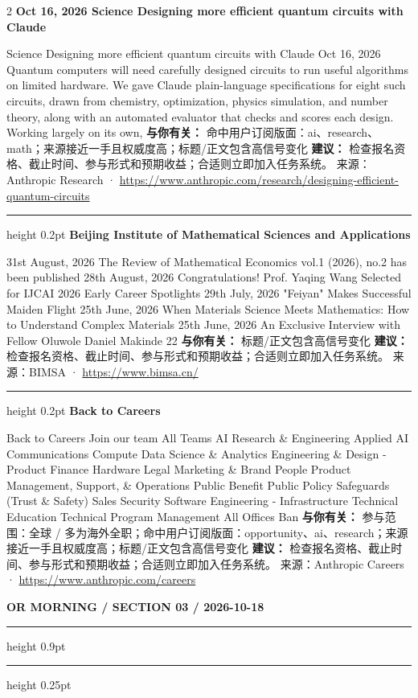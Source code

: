 \documentclass[10.5pt]{ctexart}
\begin{document}
\begin{multicols}{2}
{\large\bfseries Oct 16, 2026 Science Designing more efficient quantum circuits with Claude}\par
Science Designing more efficient quantum circuits with Claude Oct 16, 2026 Quantum computers will need carefully designed circuits to run useful algorithms on limited hardware. We gave Claude plain-language specifications for eight such circuits, drawn from chemistry, optimization, physics simulation, and number theory, along with an automated evaluator that checks and scores each design. Working largely on its own, 
\textbf{与你有关：} 命中用户订阅版面：ai、research、math；来源接近一手且权威度高；标题/正文包含高信号变化
\textbf{建议：} 检查报名资格、截止时间、参与形式和预期收益；合适则立即加入任务系统。
{\footnotesize\color{ormuted} 来源：Anthropic Research · \url{https://www.anthropic.com/research/designing-efficient-quantum-circuits}}
\vspace{2mm}
\hrule height 0.2pt
\vspace{2mm}
{\large\bfseries Beijing Institute of Mathematical Sciences and Applications}\par
31st August, 2026 The Review of Mathematical Economics vol.1 (2026), no.2 has been published 28th August, 2026 Congratulations! Prof. Yaqing Wang Selected for IJCAI 2026 Early Career Spotlights 29th July, 2026 "Feiyan" Makes Successful Maiden Flight 25th June, 2026 When Materials Science Meets Mathematics: How to Understand Complex Materials 25th June, 2026 An Exclusive Interview with Fellow Oluwole Daniel Makinde 22
\textbf{与你有关：} 标题/正文包含高信号变化
\textbf{建议：} 检查报名资格、截止时间、参与形式和预期收益；合适则立即加入任务系统。
{\footnotesize\color{ormuted} 来源：BIMSA · \url{https://www.bimsa.cn/}}
\vspace{2mm}
\hrule height 0.2pt
\vspace{2mm}
{\large\bfseries Back to Careers}\par
Back to Careers Join our team All Teams AI Research \& Engineering Applied AI Communications Compute Data Science \& Analytics Engineering \& Design - Product Finance Hardware Legal Marketing \& Brand People Product Management, Support, \& Operations Public Benefit Public Policy Safeguards (Trust \& Safety) Sales Security Software Engineering - Infrastructure Technical Education Technical Program Management All Offices Ban
\textbf{与你有关：} 参与范围：全球 / 多为海外全职；命中用户订阅版面：opportunity、ai、research；来源接近一手且权威度高；标题/正文包含高信号变化
\textbf{建议：} 检查报名资格、截止时间、参与形式和预期收益；合适则立即加入任务系统。
{\footnotesize\color{ormuted} 来源：Anthropic Careers · \url{https://www.anthropic.com/careers}}
\end{multicols}
\newpage
{\small\bfseries OR MORNING / SECTION 03 / 2026-10-18}
\vspace{2mm}
\hrule height 0.9pt
\vspace{1.5mm}
\hrule height 0.25pt
\vspace{4mm}
\end{document}
